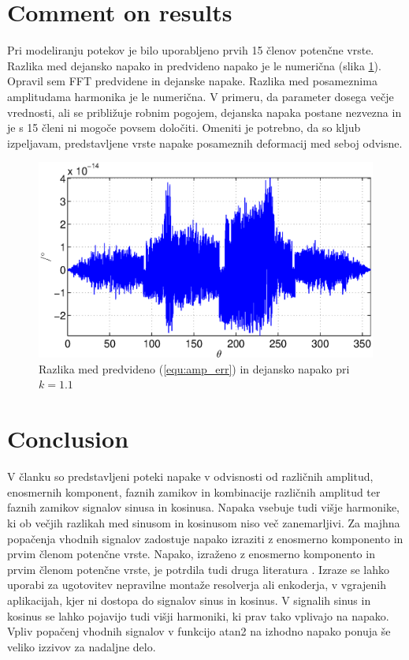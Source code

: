 \documentclass[a4paper]{article}
\begin{document}
\section{Comment on results}
Pri modeliranju potekov je bilo uporabljeno prvih 15 členov potenčne vrste. Razlika med dejansko napako in predvideno napako je le numerična (slika \ref{fig:razlika}). Opravil sem FFT predvidene in dejanske napake. Razlika med posameznima amplitudama harmonika je le numerična. V primeru, da parameter dosega večje vrednosti, ali se približuje robnim pogojem, dejanska napaka postane nezvezna in je s 15 členi ni mogoče povsem določiti. Omeniti je potrebno, da so kljub izpeljavam, predstavljene vrste napake posameznih deformacij med seboj odvisne.
\begin{figure}[!htb]
	\begin{center}
		\includegraphics[width=\linewidth]{./Slike/razlika_amp.eps}
		\caption{Razlika med predvideno (\ref{equ:amp_err}) in dejansko napako pri $k=1.1$} \label{fig:razlika}
	\end{center}
\end{figure}




\section{Conclusion}

V članku so predstavljeni poteki napake v odvisnosti od različnih amplitud, enosmernih komponent, faznih zamikov in kombinacije različnih amplitud ter faznih zamikov signalov sinusa in kosinusa. Napaka vsebuje tudi višje harmonike, ki ob večjih razlikah med sinusom in kosinusom niso več zanemarljivi. Za majhna popačenja vhodnih signalov zadostuje napako izraziti z enosmerno komponento in prvim členom potenčne vrste. Napako, izraženo z enosmerno komponento in prvim členom potenčne vrste, je potrdila tudi druga literatura \cite{RLS1}. Izraze se lahko uporabi za ugotovitev nepravilne montaže resolverja ali enkoderja, v vgrajenih aplikacijah, kjer ni dostopa do signalov sinus in kosinus. V signalih sinus in kosinus se lahko pojavijo tudi višji harmoniki, ki prav tako vplivajo na napako. Vpliv popačenj vhodnih signalov v  funkcijo atan2 na izhodno napako ponuja še veliko izzivov za nadaljne delo.
\end{document}
